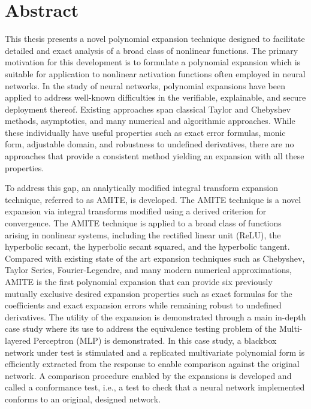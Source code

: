\chapter*{Abstract}

This thesis presents a novel polynomial expansion technique designed to facilitate detailed and exact analysis of a broad class of nonlinear functions.  The primary motivation for this development is to formulate a polynomial expansion which is suitable for application to nonlinear activation functions often employed in neural networks.  In the study of neural networks, polynomial expansions have been applied to address well-known difficulties in the verifiable, explainable, and secure deployment thereof. Existing approaches span classical Taylor and Chebyshev methods, asymptotics, and many numerical and algorithmic approaches.  While these individually have useful properties such as exact error formulas, monic form, adjustable domain, and robustness to undefined derivatives, there are no approaches that provide a consistent method yielding an expansion with all these properties.

To address this gap, an analytically modified integral transform expansion technique, referred to as AMITE, is developed.  The AMITE technique is a novel expansion via integral transforms modified using a derived criterion for convergence.  The AMITE technique is applied to a broad class of functions arising in nonlinear systems, including the rectified linear unit (ReLU), the hyperbolic secant, the hyperbolic secant squared, and the hyperbolic tangent.  Compared with existing state of the art expansion techniques such as Chebyshev, Taylor Series, Fourier-Legendre, and many modern numerical approximations, AMITE is the first polynomial expansion that can provide six previously mutually exclusive desired expansion properties such as exact formulas for the coefficients and exact expansion errors while remaining robust to undefined derivatives.  The utility of the expansion is demonstrated through a main in-depth case study where its use to address the equivalence testing problem of the Multi-layered Perceptron (MLP) is demonstrated.  In this case study, a blackbox network under test is stimulated and a replicated multivariate polynomial form is efficiently extracted from the response to enable comparison against the original network.  A comparison procedure enabled by the expansions is developed and called a conformance test, i.e., a test to check that a neural network implemented  conforms to an original, designed network.

